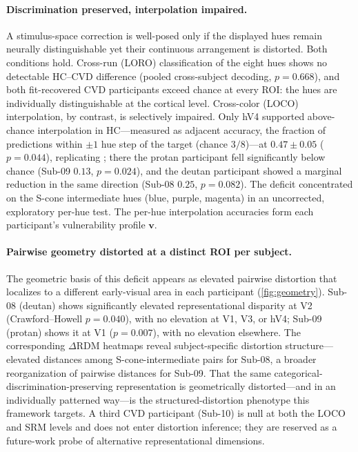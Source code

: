 \documentclass{article}
\begin{document}
\paragraph{Discrimination preserved, interpolation impaired.}
A stimulus-space correction is well-posed only if the displayed hues remain neurally distinguishable yet their continuous arrangement is distorted.
Both conditions hold.
Cross-run (LORO) classification of the eight hues shows no detectable HC--CVD difference (pooled cross-subject decoding, $p = 0.668$), and both fit-recovered CVD participants exceed chance at every ROI: the hues are individually distinguishable at the cortical level.
Cross-color (LOCO) interpolation, by contrast, is selectively impaired.
Only hV4 supported above-chance interpolation in HC---measured as adjacent accuracy, the fraction of predictions within $\pm 1$ hue step of the target (chance $3/8$)---at $0.47 \pm 0.05$ ($p = 0.044$), replicating \citet{brouwer2009}; there the protan participant fell significantly below chance (Sub-09 $0.13$, $p = 0.024$), and the deutan participant showed a marginal reduction in the same direction (Sub-08 $0.25$, $p = 0.082$). The deficit concentrated on the S-cone intermediate hues (blue, purple, magenta) in an uncorrected, exploratory per-hue test.
The per-hue interpolation accuracies form each participant's vulnerability profile $\mathbf{v}$.

\paragraph{Pairwise geometry distorted at a distinct ROI per subject.}
The geometric basis of this deficit appears as elevated pairwise distortion that localizes to a different early-visual area in each participant (\cref{fig:geometry}).
Sub-08 (deutan) shows significantly elevated representational disparity at V2 (Crawford--Howell $p = 0.040$), with no elevation at V1, V3, or hV4; Sub-09 (protan) shows it at V1 ($p = 0.007$), with no elevation elsewhere.
The corresponding $\Delta$RDM heatmaps reveal subject-specific distortion structure---elevated distances among S-cone-intermediate pairs for Sub-08, a broader reorganization of pairwise distances for Sub-09.
That the same categorical-discrimination-preserving representation is geometrically distorted---and in an individually patterned way---is the structured-distortion phenotype this framework targets.
A third CVD participant (Sub-10) is null at both the LOCO and SRM levels and does not enter distortion inference; they are reserved as a future-work probe of alternative representational dimensions.
\end{document}

